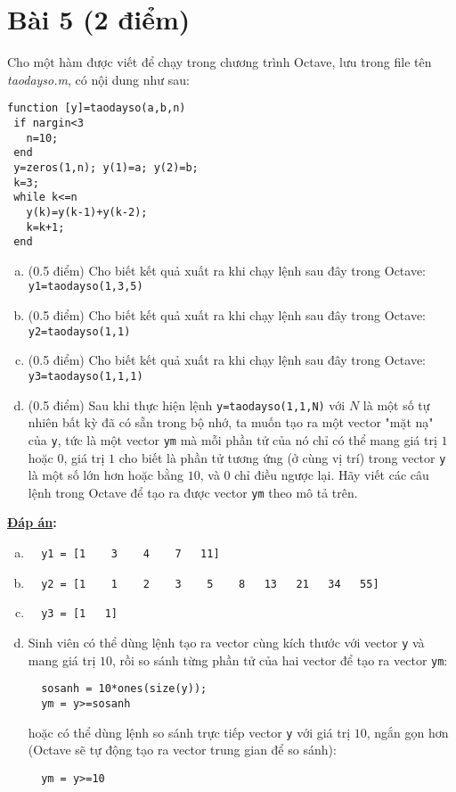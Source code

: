 \documentclass[12pt]{article}
\newcommand{\Solution}{
\medskip
{\bf \underline{Đáp án}:}
}
\begin{document}
\section{Bài 5 (2 điểm)}

Cho một hàm được viết để chạy trong chương trình Octave, lưu trong file tên \textit{taodayso.m}, có nội dung như sau:
\begin{verbatim}
function [y]=taodayso(a,b,n)
 if nargin<3
   n=10;
 end
 y=zeros(1,n); y(1)=a; y(2)=b;
 k=3;
 while k<=n
   y(k)=y(k-1)+y(k-2);
   k=k+1;
 end 
\end{verbatim}

\begin{enumerate}[a).]
 \item (0.5 điểm) Cho biết kết quả xuất ra khi chạy lệnh sau đây trong Octave: 
  \texttt{y1=taodayso(1,3,5)}
 \item (0.5 điểm) Cho biết kết quả xuất ra khi chạy lệnh sau đây trong Octave:
  \texttt{y2=taodayso(1,1)}
 \item (0.5 điểm) Cho biết kết quả xuất ra khi chạy lệnh sau đây trong Octave:
  \texttt{y3=taodayso(1,1,1)}
 \item (0.5 điểm) Sau khi thực hiện lệnh \texttt{y=taodayso(1,1,N)} với $N$ là một số tự nhiên bất kỳ đã có sẵn trong bộ nhớ, ta muốn tạo ra một vector "mặt nạ" của \texttt{y}, tức là một vector \texttt{ym} mà mỗi phần tử của nó chỉ có thể mang giá trị $1$ hoặc $0$, giá trị $1$ cho biết là phần tử tương ứng (ở cùng vị trí) trong vector \texttt{y} là một số lớn hơn hoặc bằng $10$, và $0$ chỉ điều ngược lại. Hãy viết các câu lệnh trong Octave để tạo ra được vector \texttt{ym} theo mô tả trên.
\end{enumerate}

\Solution 

\begin{enumerate}[a).]
 \item 
  \begin{verbatim}
  y1 = [1    3    4    7   11]
  \end{verbatim}
 \item 
  \begin{verbatim}
  y2 = [1    1    2    3    5    8   13   21   34   55]
  \end{verbatim}
 \item 
  \begin{verbatim}
  y3 = [1   1]
  \end{verbatim}
 \item Sinh viên có thể dùng lệnh tạo ra vector cùng kích thước với vector \texttt{y} và mang giá trị $10$, rồi so sánh từng phần tử của hai vector để tạo ra vector \texttt{ym}:
  \begin{verbatim}
  sosanh = 10*ones(size(y));
  ym = y>=sosanh
  \end{verbatim}
  hoặc có thể dùng lệnh so sánh trực tiếp vector \texttt{y} với giá trị $10$, ngắn gọn hơn (Octave sẽ tự động tạo ra vector trung gian để so sánh):
  \begin{verbatim}
  ym = y>=10
  \end{verbatim}
\end{enumerate}
\end{document}
